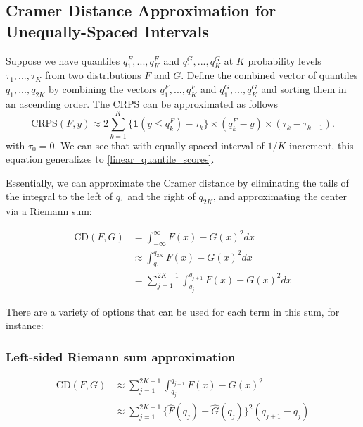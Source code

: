 \documentclass[
]{article}
\begin{document}
\hypertarget{cramer-distance-approximation-for-unequally-spaced-intervals}{%
\subsection{Cramer Distance Approximation for Unequally-Spaced
Intervals}\label{cramer-distance-approximation-for-unequally-spaced-intervals}}

Suppose we have quantiles \(q_{1}^F,...,q_{K}^F\) and
\(q_{1}^G,...,q_{K}^G\) at \(K\) probability levels
\(\tau_1,...,\tau_K\) from two distributions \(F\) and \(G\). Define the
combined vector of quantiles \(q_1, . . . , q_{2K}\) by combining the
vectors \(q_{1}^F,...,q_{K}^F\) and \(q_{1}^G,...,q_{K}^G\) and sorting
them in an ascending order. The CRPS can be approximated as follows
\begin{equation}
\text{CRPS}(F, y) \approx 2\sum_{k = 1}^K \{\mathbf{1}(y \leq q^F_k)-\tau_k\} \times (q^F_k - y) \times (\tau_k-\tau_{k-1}).\label{eq:ls_unqe}
\end{equation} with \(\tau_0=0\). We can see that with equally spaced
interval of \(1/K\) increment, this equation generalizes to
\eqref{linear_quantile_scores}.

Essentially, we can approximate the Cramer distance by eliminating the
tails of the integral to the left of \(q_1\) and the right of
\(q_{2K}\), and approximating the center via a Riemann sum:

\begin{align}
\text{CD}(F,G) &=\int^\infty_{-\infty}{F(x)−G(x)}^2dx\\
&\approx \int^{q_{2K}}_{q_1}{F(x)−G(x)}^2dx\\
&=\sum^{2K-1}_{j=1}\int^{q_{j+1}}_{q_j}{F(x)−G(x)}^2dx
\end{align}

There are a variety of options that can be used for each term in this
sum, for instance:

\hypertarget{left-sided-riemann-sum-approximation}{%
\subsubsection{Left-sided Riemann sum
approximation}\label{left-sided-riemann-sum-approximation}}

\begin{align}
\text{CD}(F,G) &\approx\sum^{2K-1}_{j=1}\int^{q_{j+1}}_{q_j}{F(x)−G(x)}^2\\
&\approx\sum^{2K-1}_{j=1}\{\hat{F}(q_j)-\hat{G}(q_j)\}^2(q_{j+1}-q_{j})\\
\end{align}
\end{document}
